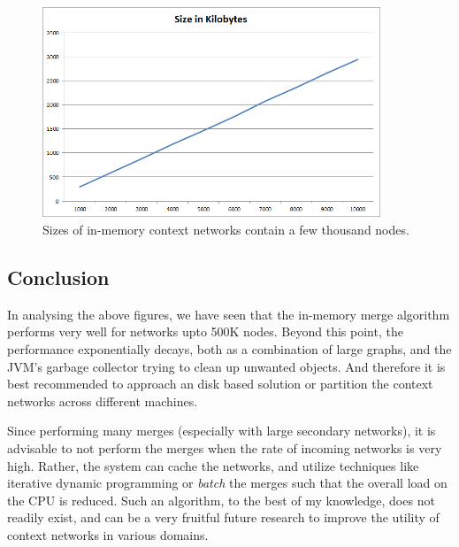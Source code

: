 \begin{figure}[t]
\centering
\includegraphics[width=0.9\textwidth]{media/chapter5/perf/size-tree-1000.png}
\caption{Sizes of in-memory context networks contain a few thousand nodes.}
\label{fig:sizes}
\end{figure}


\subsection{Conclusion}

In analysing the above figures, we have seen that the in-memory merge algorithm performs very well for networks upto 500K nodes. Beyond this point, the performance exponentially decays, both as a combination of large graphs, and the JVM's garbage collector trying to clean up unwanted objects. And therefore it is best recommended to approach an disk based solution or partition the context networks across different machines. 

Since performing many merges (especially with large secondary networks), it is advisable to not perform the merges when the rate of incoming networks is very high. Rather, the system can cache the networks, and utilize techniques like iterative dynamic programming or \textit{batch} the merges such that the overall load on the CPU is reduced. Such an algorithm, to the best of my knowledge, does not readily exist, and can be a very fruitful future research to improve the utility of context networks in various domains.


